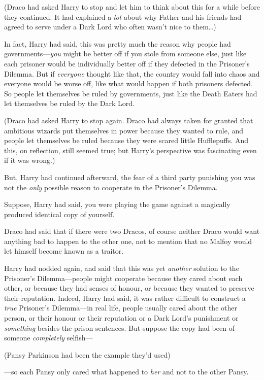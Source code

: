 (Draco had asked Harry to stop and let him to think about this for a while
before they continued. It had explained a \emph{lot} about why Father and his
friends had agreed to serve under a Dark Lord who often wasn't nice to
them…)

In fact, Harry had said, this was pretty much the reason why people had
governments---\emph{you} might be better off if you stole from someone else,
just like each prisoner would be individually better off if they defected in
the Prisoner's Dilemma. But if \emph{everyone} thought like that, the country
would fall into chaos and everyone would be worse off, like what would happen
if both prisoners defected. So people let themselves be ruled by governments,
just like the Death Eaters had let themselves be ruled by the Dark Lord.

(Draco had asked Harry to stop again. Draco had always taken for granted that
ambitious wizards put themselves in power because they wanted to rule, and
people let themselves be ruled because they were scared little Hufflepuffs. And
this, on reflection, still seemed true; but Harry's perspective was fascinating
even if it was wrong.)

But, Harry had continued afterward, the fear of a third party punishing you was
not the \emph{only} possible reason to cooperate in the Prisoner's Dilemma.

Suppose, Harry had said, you were playing the game against a magically produced
identical copy of yourself.

Draco had said that if there were two Dracos, of course neither Draco would
want anything bad to happen to the other one, not to mention that no Malfoy
would let himself become known as a traitor.

Harry had nodded again, and said that this was yet \emph{another} solution to
the Prisoner's Dilemma---people might cooperate because they cared about each
other, or because they had senses of honour, or because they wanted to preserve
their reputation. Indeed, Harry had said, it was rather difficult to construct
a \emph{true} Prisoner's Dilemma---in real life, people usually cared about the
other person, or their honour or their reputation or a Dark Lord's punishment or
\emph{something} besides the prison sentences. But suppose the copy had been of
someone \emph{completely} selfish---

(Pansy Parkinson had been the example they'd used)

---so each Pansy only cared what happened to \emph{her} and not to the other
Pansy.


